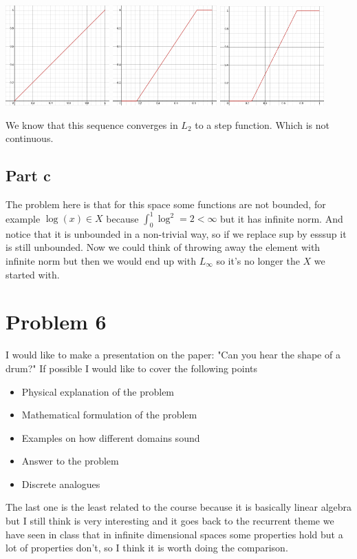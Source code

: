 \documentclass[12pt]{article}%
\begin{document}
\includegraphics[width=0.3\textwidth]{f1.png}
\includegraphics[width=0.3\textwidth]{f2.png}
\includegraphics[width=0.3\textwidth]{f3.png}

We know that this sequence converges in $L_2$ to a step function. Which is not
continuous.
\subsection*{Part c}
The problem here is that for this space some functions are not bounded, for
example $\log(x)\in X$ because $\int_0^1\log^2=2<\infty$ but it has infinite
norm. And notice that it is unbounded in a non-trivial way, so if we replace
sup by esssup it is still unbounded. Now we could think of throwing away the
element with infinite norm but then we would end up with $L_\infty$ so it's no
longer the $X$ we started with.
\section*{Problem 6}
I would like to make a presentation on the paper: "Can you hear the shape of a
drum?" If possible I would like to cover the following points
\begin{itemize}
\item	Physical explanation of the problem
\item	Mathematical formulation of the problem
\item	Examples on how different domains sound
\item	Answer to the problem
\item	Discrete analogues
\end{itemize}
The last one is the least related to the course because it is basically linear
algebra but I still think is very interesting and it goes back to the recurrent
theme we have seen in class that in infinite dimensional spaces some properties
hold but a lot of properties don't, so I think it is worth doing the comparison.

\nocite{Schauder_then_separable}


\end{document}
